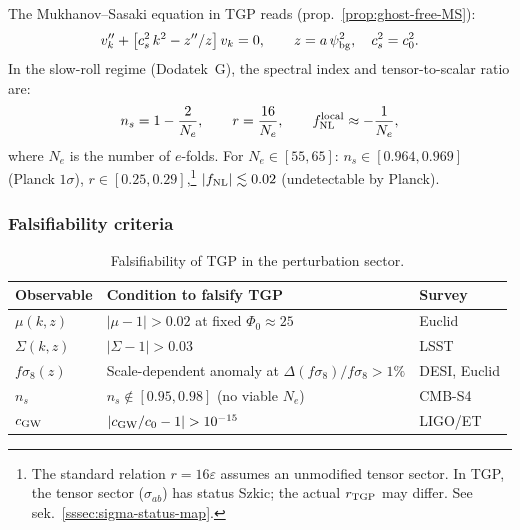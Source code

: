 The Mukhanov--Sasaki equation in TGP reads (prop.~\ref{prop:ghost-free-MS}):
\begin{equation}\label{eq:MS-TGP}
  v_k'' + \bigl[c_s^2\,k^2 - z''/z\bigr]\,v_k = 0,
  \qquad z = a\,\psi_{\rm bg}^2,\quad c_s^2 = c_0^2.
\end{equation}
In the slow-roll regime (Dodatek~G), the spectral index and
tensor-to-scalar ratio are:
\begin{equation}\label{eq:ns-r-TGP}
  n_s = 1 - \frac{2}{N_e}, \qquad
  r = \frac{16}{N_e}, \qquad
  f_{\rm NL}^{\rm local} \approx -\frac{1}{N_e},
\end{equation}
where $N_e$ is the number of $e$-folds.
For $N_e \in [55, 65]$:
$n_s \in [0.964, 0.969]$ (Planck $1\sigma$),
$r \in [0.25, 0.29]$,\footnote{%
  The standard relation $r = 16\varepsilon$ assumes
  an unmodified tensor sector. In TGP, the tensor sector
  ($\sigma_{ab}$) has status Szkic; the actual $r_{\rm TGP}$
  may differ. See sek.~\ref{sssec:sigma-status-map}.}
$|f_{\rm NL}| \lesssim 0.02$ (undetectable by Planck).

\subsubsection{Falsifiability criteria}%
\label{sssec:falsifiability-lss}

\begin{table}[h]
\centering\small
\caption{Falsifiability of TGP in the perturbation sector.}
\label{tab:falsifiability}
\begin{tabular}{@{}lp{5.5cm}l@{}}
\toprule
\textbf{Observable} & \textbf{Condition to falsify TGP} &
\textbf{Survey} \\
\midrule
$\mu(k,z)$ & $|\mu - 1| > 0.02$ at fixed $\Phi_0 \approx 25$
& Euclid \\
$\Sigma(k,z)$ & $|\Sigma - 1| > 0.03$
& LSST \\
$f\sigma_8(z)$ & Scale-dependent anomaly at
$\Delta(f\sigma_8)/f\sigma_8 > 1\%$
& DESI, Euclid \\
$n_s$ & $n_s \notin [0.95, 0.98]$ (no viable $N_e$)
& CMB-S4 \\
$c_{\rm GW}$ & $|c_{\rm GW}/c_0 - 1| > 10^{-15}$
& LIGO/ET \\
\bottomrule
\end{tabular}
\end{table}

